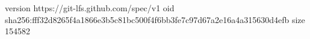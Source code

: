 version https://git-lfs.github.com/spec/v1
oid sha256:fff32d8265f4a1866e3b5c81bc500f4f6bb3fe7c97d67a2e16a4a315630d4efb
size 154582
